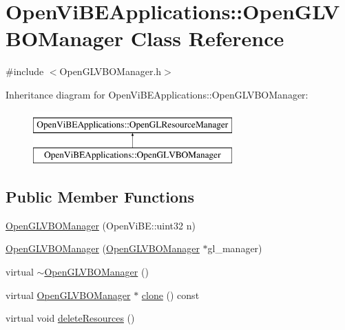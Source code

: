 \hypertarget{classOpenViBEApplications_1_1OpenGLVBOManager}{
\section{OpenViBEApplications::OpenGLVBOManager Class Reference}
\label{classOpenViBEApplications_1_1OpenGLVBOManager}
}


{\ttfamily \#include $<$OpenGLVBOManager.h$>$}

Inheritance diagram for OpenViBEApplications::OpenGLVBOManager:\begin{figure}[H]
\begin{center}
\leavevmode
\includegraphics[height=2.000000cm]{classOpenViBEApplications_1_1OpenGLVBOManager}
\end{center}
\end{figure}
\subsection*{Public Member Functions}
\begin{DoxyCompactItemize}
\item 
\hyperlink{classOpenViBEApplications_1_1OpenGLVBOManager_a975ea19fac4234a944bb23d1ae5fa03f}{OpenGLVBOManager} (OpenViBE::uint32 n)
\item 
\hyperlink{classOpenViBEApplications_1_1OpenGLVBOManager_a1a59dc661aa7726e0804319cb63e1424}{OpenGLVBOManager} (\hyperlink{classOpenViBEApplications_1_1OpenGLVBOManager}{OpenGLVBOManager} $\ast$gl\_\-manager)
\item 
virtual \hyperlink{classOpenViBEApplications_1_1OpenGLVBOManager_ab0722d150243c69b26cdfa1f3dbe3501}{$\sim$OpenGLVBOManager} ()
\item 
virtual \hyperlink{classOpenViBEApplications_1_1OpenGLVBOManager}{OpenGLVBOManager} $\ast$ \hyperlink{classOpenViBEApplications_1_1OpenGLVBOManager_a4d32c7f6bbd03683588b48bf7167ab8a}{clone} () const 
\item 
virtual void \hyperlink{classOpenViBEApplications_1_1OpenGLVBOManager_adc61b3455ba60ee1f57b8dc2117514ed}{deleteResources} ()
\end{DoxyCompactItemize}

